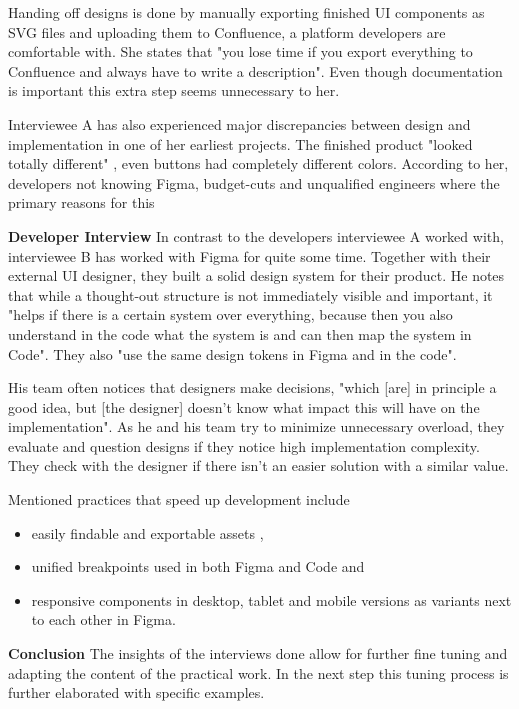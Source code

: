 Handing off designs is done by manually exporting finished UI components as SVG files and
uploading them to Confluence, a platform developers are comfortable with. She states that "you lose
time if you export everything to Confluence and always have to write a description".
 Even though documentation is important
this extra step seems unnecessary to her.

Interviewee A has also experienced major discrepancies between design and implementation in one of her
earliest projects. The finished product "looked totally different"
, even buttons had completely different
colors. According to her, developers not knowing Figma, budget-cuts and unqualified engineers where
the primary reasons for this 

\textbf{Developer Interview}
In contrast to the developers interviewee A worked with, interviewee B has worked with Figma for
quite some time. Together with their external UI designer, they built a solid design system for
their product. He notes that while a thought-out structure is not immediately visible and important,
it "helps if there is a certain system over everything, because then you also understand in the code
what the system is and can then map the system in Code".
 They also "use the same
design tokens in Figma and in the code". 

His team often notices that designers make decisions, "which [are] in principle a good idea, but
    [the designer] doesn't know what impact this will have on the implementation".
 As he and his team try to minimize
unnecessary overload, they evaluate and question designs if they notice high implementation
complexity. They check with the designer if there isn't an easier solution with
a similar value. 

Mentioned practices that speed up development include
\begin{itemize}
    \item easily findable and exportable assets ,
    \item unified breakpoints used in both Figma and Code
           and
    \item responsive components in desktop, tablet and mobile versions as variants next to each
          other in Figma. 
\end{itemize}

\textbf{Conclusion}
The insights of the interviews done allow for further fine tuning and adapting the content of the
practical work. In the next step this tuning process is further elaborated with specific examples.
